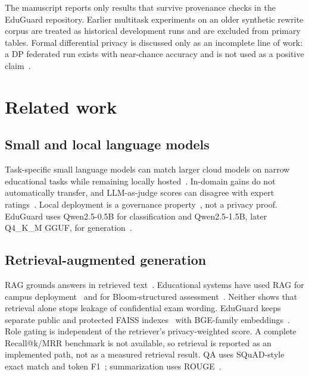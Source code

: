 \documentclass[review,12pt]{elsarticle}
\begin{document}
The manuscript reports only results that survive provenance checks in the EduGuard repository.
Earlier multitask experiments on an older synthetic rewrite corpus are treated as historical development runs and are excluded from primary tables.
Formal differential privacy is discussed only as an incomplete line of work: a DP federated run exists with near-chance accuracy and is not used as a positive claim~\cite{abadi2016dpsgd}.

\section{Related work}

\subsection{Small and local language models}
Task-specific small language models can match larger cloud models on narrow educational tasks while remaining locally hosted~\cite{slm2026teammates,saur2026grading,tinyllm2024,localai2026}.
In-domain gains do not automatically transfer, and LLM-as-judge scores can disagree with expert ratings~\cite{slm2026teammates,saur2026grading}.
Local deployment is a governance property~\cite{bogicevic2026rag,localai2026}, not a privacy proof.
EduGuard uses Qwen2.5-0.5B for classification and Qwen2.5-1.5B, later Q4\_K\_M GGUF, for generation~\cite{qwen2024technical}.

\subsection{Retrieval-augmented generation}
RAG grounds answers in retrieved text~\cite{lewis2020rag}.
Educational systems have used RAG for campus deployment~\cite{bogicevic2026rag} and for Bloom-structured assessment~\cite{ragcognitive2025}.
Neither shows that retrieval alone stops leakage of confidential exam wording.
EduGuard keeps separate public and protected FAISS indexes~\cite{johnson2019faiss} with BGE-family embeddings~\cite{xiao2024bge}.
Role gating is independent of the retriever's privacy-weighted score.
A complete Recall@k/MRR benchmark is not available, so retrieval is reported as an implemented path, not as a measured retrieval result.
QA uses SQuAD-style exact match and token F1~\cite{rajpurkar2016squad}; summarization uses ROUGE~\cite{lin2004rouge}.
\end{document}
